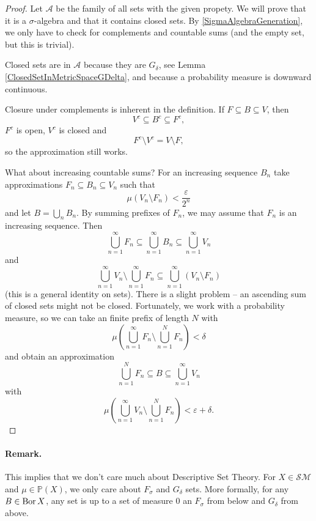 \begin{proof}
    Let \( \mathcal{A} \) be the family of all sets with the given propety. We will prove that it is a \( \sigma \)-algebra and that it contains closed sets. By \ref{SigmaAlgebraGeneration}, we only have to check for complements and countable sums (and the empty set, but this is trivial).

    Closed sets are in \( \mathcal{A} \) because they are \( G_\delta \), see Lemma \ref{ClosedSetInMetricSpaceGDelta}, and because a probability measure is downward continuous.

    Closure under complements is inherent in the definition. If \( F \subseteq B \subseteq V \), then 
    \[ 
      V^c \subseteq B^c \subseteq F^c,
   \]
   \( F^c \) is open, \( V^c \) is closed and
   \[ 
      F^c \setminus V^c = V \setminus F, 
  \]
  so the approximation still works.

What about increasing countable sums? For an increasing sequence \( B_n \) take approximations \( F_n \subseteq B_n \subseteq V_n \) such that
\[ 
    \mu \left( V_n \setminus F_n \right) < \frac{\varepsilon }{2^n}
\]
and let \( B = \bigcup_n B_n \). By summing prefixes of \( F_n \), we may assume that \( F_n \) is an increasing sequence. Then
\[ 
    \bigcup_{n=1}^\infty F_n \subseteq \bigcup_{n=1}^\infty B_n \subseteq \bigcup_{n=1}^\infty V_n
\]
and
\[ 
    \bigcup_{n=1}^\infty V_n \setminus \bigcup_{n=1}^\infty F_n \subseteq \bigcup_{n=1}^\infty (V_n \setminus F_n) 
\]
(this is a general identity on sets). There is a slight problem -- an ascending sum of closed sets might not be closed. Fortunately, we work with a probability measure, so we can take an finite prefix of length \( N \) with
\[ 
    \mu \left( \bigcup_{n=1}^\infty F_n \setminus \bigcup_{n=1}^N F_n \right) < \delta
\]
and obtain an approximation
\[ 
    \bigcup_{n=1}^N F_n \subseteq B \subseteq \bigcup_{n=1}^\infty V_n 
\]
with
\[ 
    \mu \left( \bigcup_{n=1}^\infty V_n \setminus \bigcup_{n=1}^N F_n \right) <\varepsilon + \delta. 
\]
\end{proof}


\paragraph{Remark.} This implies that we don't care much about Descriptive Set Theory. For \( X \in \mathcal{SM} \) and \( \mu \in \mathbb{P}(X) \), we only care about \( F_\sigma \) and \( G_\delta \) sets. More formally, for any \( B \in \operatorname{Bor} X \), any set is up to a set of measure \( 0 \) an \( F_\sigma \) from below and \( G_\delta \) from above.

